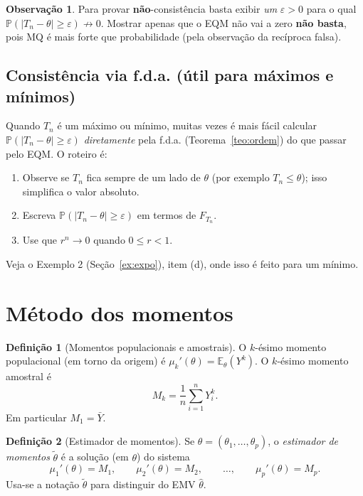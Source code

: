 \documentclass[11pt,a4paper]{article}
\theoremstyle{definition}
\newtheorem{definicao}{Definição}[section]
\newtheorem{observacao}{Observação}[section]
\theoremstyle{plain}
\newcommand{\E}{\mathbb{E}}
\newcommand{\Prob}{\mathbb{P}}
\newcommand{\bY}{\bar{Y}}
\begin{document}
\begin{observacao}
Para provar \textbf{não}-consistência basta exibir \emph{um} $\varepsilon>0$ para o qual $\Prob(|T_n-\theta|\ge\varepsilon)\not\to0$. Mostrar apenas que o EQM não vai a zero \textbf{não basta}, pois MQ é mais forte que probabilidade (pela observação da recíproca falsa).
\end{observacao}

\subsection{Consistência via f.d.a. (útil para máximos e mínimos)}

Quando $T_n$ é um máximo ou mínimo, muitas vezes é mais fácil calcular $\Prob(|T_n-\theta|\ge\varepsilon)$ \emph{diretamente} pela f.d.a. (Teorema~\ref{teo:ordem}) do que passar pelo EQM. O roteiro é:
\begin{enumerate}[label=\arabic*.]
\item Observe se $T_n$ fica sempre de um lado de $\theta$ (por exemplo $T_n\le\theta$); isso simplifica o valor absoluto.
\item Escreva $\Prob(|T_n-\theta|\ge\varepsilon)$ em termos de $F_{T_n}$.
\item Use que $r^n\to0$ quando $0\le r<1$.
\end{enumerate}
Veja o Exemplo 2 (Seção~\ref{ex:expo}), item (d), onde isso é feito para um mínimo.

\section{Método dos momentos}

\begin{definicao}[Momentos populacionais e amostrais]
O $k$-ésimo momento populacional (em torno da origem) é $\mu_k'(\theta)=\E_\theta(Y^k)$. O $k$-ésimo momento amostral é
\[
M_k=\frac1n\sum_{i=1}^n Y_i^k .
\]
Em particular $M_1=\bY$.
\end{definicao}

\begin{definicao}[Estimador de momentos]
Se $\theta=(\theta_1,\dots,\theta_p)$, o \emph{estimador de momentos} $\tilde\theta$ é a solução (em $\theta$) do sistema
\[
\mu_1'(\theta)=M_1,\qquad \mu_2'(\theta)=M_2,\qquad \dots,\qquad \mu_p'(\theta)=M_p .
\]
Usa-se a notação $\tilde\theta$ para distinguir do EMV $\hat\theta$.
\end{definicao}
\end{document}
